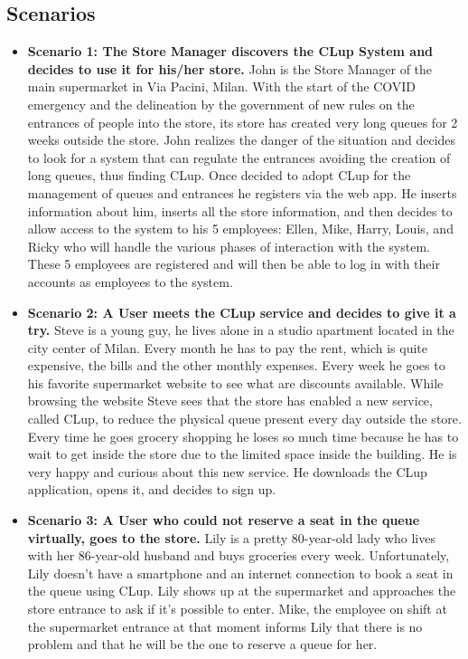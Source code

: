 \subsection{Scenarios}

\begin{itemize}
    \item \textbf{Scenario 1: The Store Manager discovers the CLup System and decides to use it for his/her store.} John is the Store Manager of the main supermarket in Via Pacini, Milan. With the start of the COVID emergency and the delineation by the government of new rules on the entrances of people into the store, its store has created very long queues for 2 weeks outside the store. John realizes the danger of the situation and decides to look for a system that can regulate the entrances avoiding the creation of long queues, thus finding CLup.
    Once decided to adopt CLup for the management of queues and entrances he registers via the web app. He inserts information about him, inserts all the store information, and then decides to allow access to the system to his 5 employees: Ellen, Mike, Harry, Louis, and Ricky who will handle the various phases of interaction with the system. These 5 employees are registered and will then be able to log in with their accounts as employees to the system.
    \item \textbf{Scenario 2: A User meets the CLup service and decides to give it a try.} Steve is a young guy, he lives alone in a studio apartment located in the city center of Milan. Every month he has to pay the rent, which is quite expensive, the bills and the other monthly expenses. Every week he goes to his favorite supermarket website to see what are discounts available. While browsing the website Steve sees that the store has enabled a new service, called CLup, to reduce the physical queue present every day outside the store. 
    Every time he goes grocery shopping he loses so much time because he has to wait to get inside the store due to the limited space inside the building. He is very happy and curious about this new service. He downloads the CLup application, opens it, and decides to sign up.
    \item \textbf{Scenario 3: A User who could not reserve a seat in the queue virtually, goes to the store.} Lily is a pretty 80-year-old lady who lives with her 86-year-old husband and buys groceries every week. Unfortunately, Lily doesn’t have a smartphone and an internet connection to book a seat in the queue using CLup. Lily shows up at the supermarket and approaches the store entrance to ask if it’s possible to enter. Mike, the employee on shift at the supermarket entrance at that moment informs Lily that there is no problem and that he will be the one to reserve a queue for her.

\end{itemize}
